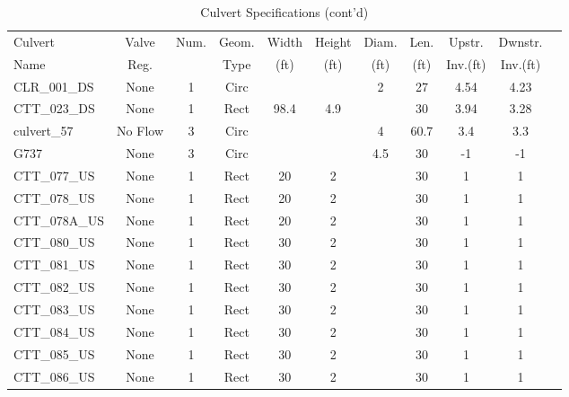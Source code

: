 \begin{table}[]
\caption{Culvert Specifications (cont'd)}
\label{tab:culv-specs3}
\begin{tabular}{@{}lcccccccccc@{}}
\toprule
Culvert       & Valve      & Num.     & Geom.& Width  & Height & Diam.    & Len.   & Upstr.    & Dwnstr.    \\
Name          & Reg.       &          & Type & (ft)   & (ft)   & (ft)     & (ft)   & Inv.(ft)  & Inv.(ft)   \\
\midrule
CLR\_001\_DS  & None       & 1        & Circ &        &       & 2        & 27     & 4.54      & 4.23       \\
CTT\_023\_DS  & None       & 1        & Rect & 98.4   & 4.9   &          & 30     & 3.94      & 3.28       \\
culvert\_57   & No Flow    & 3        & Circ &        &       & 4        & 60.7   & 3.4       & 3.3        \\
G737          & None       & 3        & Circ &        &       & 4.5      & 30     & -1        & -1         \\
CTT\_077\_US  & None       & 1        & Rect & 20     & 2     &          & 30     & 1         & 1          \\
CTT\_078\_US  & None       & 1        & Rect & 20     & 2     &          & 30     & 1         & 1          \\
CTT\_078A\_US & None       & 1        & Rect & 20     & 2     &          & 30     & 1         & 1          \\
CTT\_080\_US  & None       & 1        & Rect & 30     & 2     &          & 30     & 1         & 1          \\
CTT\_081\_US  & None       & 1        & Rect & 30     & 2     &          & 30     & 1         & 1          \\
CTT\_082\_US  & None       & 1        & Rect & 30     & 2     &          & 30     & 1         & 1          \\
CTT\_083\_US  & None       & 1        & Rect & 30     & 2     &          & 30     & 1         & 1          \\
CTT\_084\_US  & None       & 1        & Rect & 30     & 2     &          & 30     & 1         & 1          \\
CTT\_085\_US  & None       & 1        & Rect & 30     & 2     &          & 30     & 1         & 1          \\
CTT\_086\_US  & None       & 1        & Rect & 30     & 2     &          & 30     & 1         & 1          \\

\end{tabular}
\end{table}
